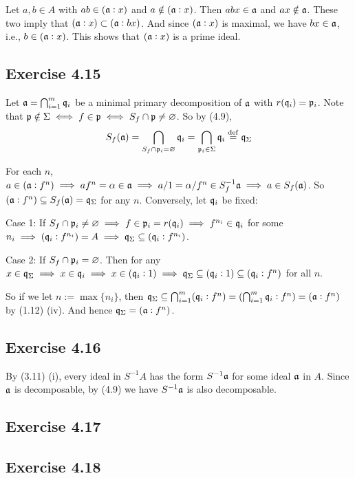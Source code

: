 \documentclass[../A&R.tex]{subfiles}
\begin{document}
Let $a,b \in A$ with $ab \in (\mathfrak{a}:x)$ and $a \notin (\mathfrak{a}:x)$. Then $abx \in \mathfrak{a}$ and $ax \notin \mathfrak{a}$. These two imply that $(\mathfrak{a}:x) \subset (\mathfrak{a}:bx)$. And since $(\mathfrak{a}:x)$ is maximal, we have $bx \in \mathfrak{a}$, i.e., $b \in (\mathfrak{a}:x)$. This shows that $(\mathfrak{a}:x)$ is a prime ideal.

\subsection*{Exercise 4.15}

Let $\mathfrak{a} = \bigcap_{i=1}^m \mathfrak{q}_i$ be a minimal primary decomposition of $\mathfrak{a}$ with $r(\mathfrak{q}_i)=\mathfrak{p}_i$. Note that $\mathfrak{p} \notin \Sigma \iff f \in \mathfrak{p} \iff S_f \cap \mathfrak{p} \neq \varnothing$. So by (4.9),
$$
S_f(\mathfrak{a})
= \bigcap_{S_f \cap \mathfrak{p}_i = \varnothing} \mathfrak{q}_i
= \bigcap_{\mathfrak{p}_i \in \Sigma} \mathfrak{q}_i
\overset{\operatorname{def}}{=} \mathfrak{q}_\Sigma
$$

For each $n$, $a \in (\mathfrak{a}:f^n) \implies af^n = \alpha \in \mathfrak{a} \implies a/1 = \alpha/f^n \in S_f^{-1}\mathfrak{a} \implies a \in S_f(\mathfrak{a})$. So $(\mathfrak{a}:f^n) \subseteq S_f(\mathfrak{a}) = \mathfrak{q}_\Sigma$ for any $n$. Conversely, let $\mathfrak{q}_i$ be fixed:

Case 1: If $S_f \cap \mathfrak{p}_i \neq \varnothing \implies f \in \mathfrak{p}_i = r(\mathfrak{q}_i) \implies f^{n_i} \in \mathfrak{q}_i$ for some $n_i \implies (\mathfrak{q}_i:f^{n_i}) = A \implies \mathfrak{q}_\Sigma \subseteq (\mathfrak{q}_i : f^{n_i})$.

Case 2: If $S_f \cap \mathfrak{p}_i = \varnothing$. Then for any $x \in \mathfrak{q}_\Sigma \implies x \in \mathfrak{q}_i \implies x \in (\mathfrak{q}_i:1) \implies \mathfrak{q}_\Sigma \subseteq (\mathfrak{q}_i:1) \subseteq (\mathfrak{q}_i:f^n)$ for all $n$.

So if we let $n:=\max \{n_i\}$, then $\mathfrak{q}_\Sigma \subseteq \bigcap_{i=1}^m (\mathfrak{q}_i:f^n) = (\bigcap_{i=1}^m \mathfrak{q}_i : f^n) = (\mathfrak{a}:f^n)$ by (1.12) (iv). And hence $\mathfrak{q}_\Sigma = (\mathfrak{a}:f^n)$.

\subsection*{Exercise 4.16}

By (3.11) (i), every ideal in $S^{-1}A$ has the form $S^{-1}\mathfrak{a}$ for some ideal $\mathfrak{a}$ in $A$. Since $\mathfrak{a}$ is decomposable, by (4.9) we have $S^{-1}\mathfrak{a}$ is also decomposable.

\subsection*{Exercise 4.17}

\subsection*{Exercise 4.18}
\end{document}
